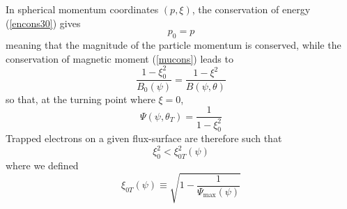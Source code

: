 In spherical momentum coordinates $\left( p,\xi\right) $, the conservation
of energy (\ref{encons30}) gives 
\begin{equation}
p_{0}=p
\end{equation}
meaning that the magnitude of the particle momentum is conserved, while the
conservation of magnetic moment (\ref{mucons}) leads to%
\begin{equation}
\dfrac{1-\xi_{0}^{2}}{B_{0}\left( \psi\right) }=\dfrac{1-\xi^{2}}{B\left(
\psi,\theta\right) }   \label{mucons2}
\end{equation}
so that, at the turning point where $\xi=0$,%
\begin{equation}
\Psi\left( \psi,\theta_{T}\right) =\dfrac{1}{1-\xi_{0}^{2}}   \label{Psidef}
\end{equation}
Trapped electrons on a given flux-surface are therefore such that%
\begin{equation}
\xi_{0}^{2}<\xi_{0T}^{2}\left( \psi\right)
\end{equation}
where we defined%
\begin{equation}
\xi_{0T}\left( \psi\right) \equiv\sqrt{1-\dfrac{1}{\Psi_{\max}\left(
\psi\right) }}   \label{xi0t2}
\end{equation}

